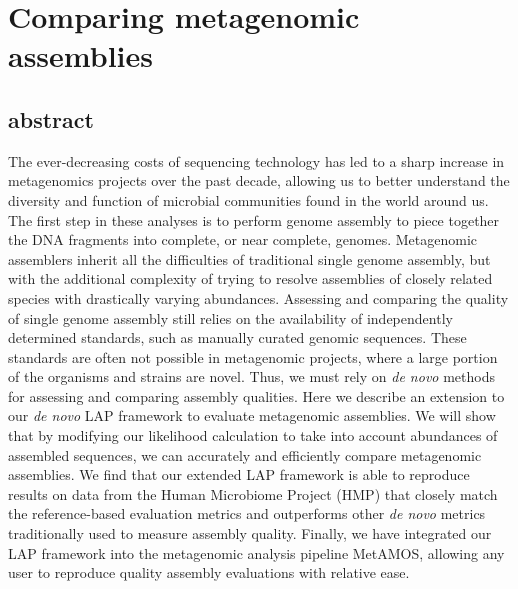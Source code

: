 
\renewcommand{\thechapter}{2}

\chapter{Comparing metagenomic assemblies}

\section{abstract}
The ever-decreasing costs of sequencing technology has led to a sharp increase in metagenomics projects over the past decade, allowing us to better understand the diversity and function of microbial communities found in the world around us.
The first step in these analyses is to perform
genome assembly to piece together the DNA fragments into complete, or
near complete, genomes.
Metagenomic assemblers inherit all the difficulties of traditional single genome assembly, but with the additional complexity of trying to resolve assemblies of closely related species with drastically varying abundances.
Assessing and comparing the quality of single genome assembly still relies on the availability of independently determined standards, such as manually curated genomic sequences.
These standards are often not possible in metagenomic projects, where a large portion of the organisms and strains are novel.
Thus, we must rely on \emph{de novo} methods for assessing and comparing assembly qualities.
Here we describe an extension to our \emph{de novo} LAP framework to evaluate metagenomic assemblies.
We will show that by modifying our likelihood calculation to take into account abundances of assembled sequences, we can accurately and efficiently compare metagenomic assemblies.
We find that our extended LAP framework is able to reproduce results on data from the Human Microbiome Project (HMP) that closely match the reference-based evaluation metrics and outperforms other \emph{de novo} metrics traditionally used to measure assembly quality.
Finally, we have integrated our LAP framework into the metagenomic analysis pipeline MetAMOS, allowing any user to reproduce quality assembly evaluations with relative ease.


